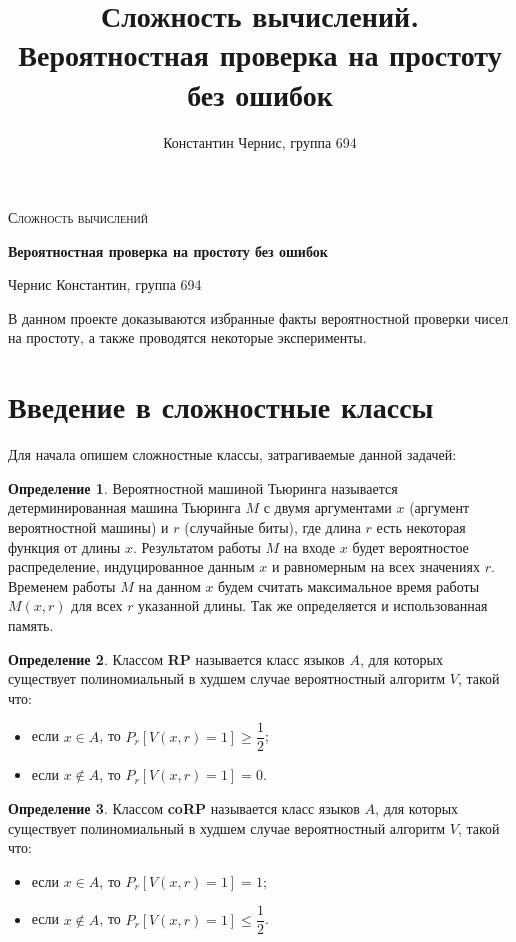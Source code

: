 \documentclass[12pt]{article}
\title{Сложность вычислений. \\
Вероятностная проверка на простоту без ошибок}
\date{}
\author{Константин Чернис, группа 694}
\theoremstyle{definition}
\newtheorem{Def}{Определение}
\numberwithin{Def}{section}
\numberwithin{Th}{section}
\numberwithin{St}{section}
\numberwithin{Cor}{section}
\begin{document}
\begin{titlepage}
	\centering
	{\scshape\Large Сложность вычислений\par}
	\vspace{1.5cm}
	{\huge\bfseries Вероятностная проверка на простоту без ошибок\par}
	\vspace{2cm}
	{\Large Чернис Константин, группа 694\par}
	\newpage
\end{titlepage}
\tableofcontents
\newpage

В данном проекте доказываются избранные факты вероятностной
проверки чисел на простоту, а также проводятся некоторые 
эксперименты.

\section{Введение в сложностные классы}

Для начала опишем сложностные классы, затрагиваемые данной задачей:

\begin{Def}
	Вероятностной машиной Тьюринга называется детерминированная машина Тьюринга $M$ с
	двумя аргументами $x$ (аргумент вероятностной машины) и $r$ (случайные биты), где
	длина $r$ есть некоторая функция от длины $x$. Результатом работы $M$ на входе $x$
	будет вероятностое распределение, индуцированное данным $x$ и равномерным на всех
	значениях $r$. Временем работы $M$ на данном $x$ будем считать максимальное время работы
	$M(x,r)$ для всех $r$ указанной длины. Так же определяется и использованная память.
\end{Def}

\begin{Def}
	Классом \textbf{RP} называется класс языков $A$, для которых существует полиномиальный
	в худшем случае вероятностный алгоритм $V$, такой что:
	
	\begin{itemize}
		\item если $x\in A$, то $P_r[V(x,r)=1]\geqslant\dfrac 12$;
		\item если $x\notin A$, то $P_r[V(x,r)=1]=0$.
	\end{itemize}
\end{Def}

\begin{Def}
	Классом \textbf{coRP} называется класс языков $A$, для которых существует полиномиальный
	в худшем случае вероятностный алгоритм $V$, такой что:
	
	\begin{itemize}
		\item если $x\in A$, то $P_r[V(x,r)=1]=1$;
		\item если $x\notin A$, то $P_r[V(x,r)=1]\leqslant\dfrac 12$.
	\end{itemize}	
\end{Def}
	
\end{document}
